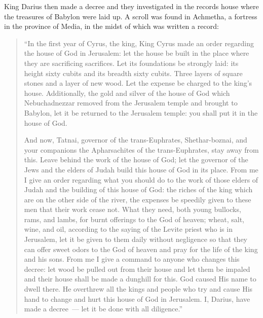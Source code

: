 
\begin{inparaenum}
   King Darius then made a decree and they investigated in the records house where the treasures of Babylon were laid up.%
   A scroll was found in Achmetha, a fortress in the province of Media, in the midst of which was written a record:%
\end{inparaenum}

\begin{quotation}
  \begin{inparaenum}\setcounter{enumi}{2}
     ``In the first year of Cyrus, the king, King Cyrus made an order regarding the house of God in Jerusalem: let the house be built in the place where they are sacrificing sacrifices. Let its foundations be strongly laid: its height sixty cubits and its breadth sixty cubits.%
     Three layers of square stones and a layer of new wood. Let the expense be charged to the king's house.%
     Additionally, the gold and silver of the house of God which Nebuchadnezzar removed from the Jerusalem temple and brought to Babylon, let it be returned to the Jerusalem temple: you shall put it in the house of God.%

     And now, Tatnai, governor of the trans-Euphrates, Shethar-boznai, and your companions the Apharsachites of the trans-Euphrates, stay away from this.%
     Leave behind the work of the house of God; let the governor of the Jews and the elders of Judah build this house of God in its place.%
     From me I give an order regarding what you should do to the work of those elders of Judah and the building of this house of God: the riches of the king which are on the other side of the river, the expenses be speedily given to these men that their work cease not.%
     What they need, both young bullocks, rams, and lambs, for burnt offerings to the God of heaven; wheat, salt, wine, and oil, according to the saying of the Levite priest who is in Jerusalem, let it be given to them daily without negligence%
     so that they can offer sweet odors to the God of heaven and pray for the life of the king and his sons.%
     From me I give a command to anyone who changes this decree: let wood be pulled out from their house and let them be impaled and their house shall be made a dunghill for this.%
     God caused His name to dwell there. He overthrew all the kings and people who try and cause His hand to change and hurt this house of God in Jerusalem. I, Darius, have made a decree~--- let it be done with all diligence.''%
  \end{inparaenum}
\end{quotation}


